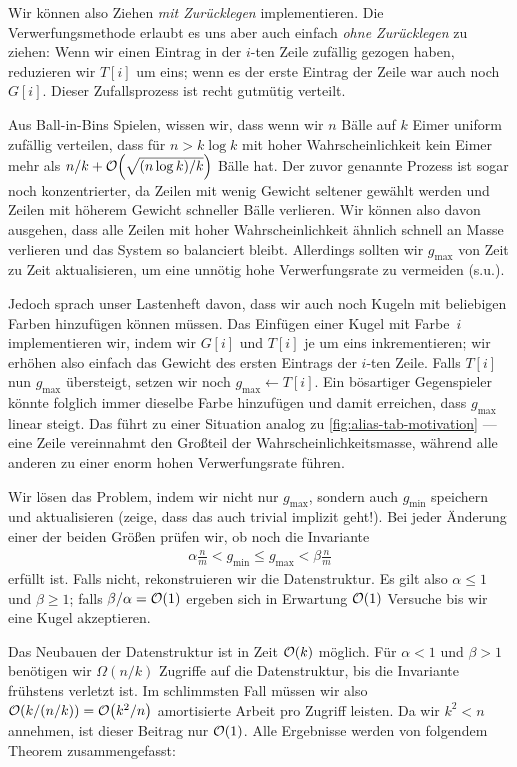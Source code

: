 Wir können also Ziehen \emph{mit Zurücklegen} implementieren.
Die Verwerfungsmethode erlaubt es uns aber auch einfach \emph{ohne Zurücklegen} zu ziehen:
Wenn wir einen Eintrag in der $i$-ten Zeile zufällig gezogen haben, reduzieren wir $T[i]$ um eins;
wenn es der erste Eintrag der Zeile war auch noch $G[i]$.
Dieser Zufallsprozess ist recht gutmütig verteilt.

Aus Ball-in-Bins Spielen, wissen wir, dass wenn wir $n$ Bälle auf $k$ Eimer uniform zufällig verteilen, dass für $n > k \log k$ mit hoher Wahrscheinlichkeit kein Eimer mehr als $n/k +\mathcal{O}\!\left(\sqrt{(n\log k) / k}\right)$ Bälle hat.
Der zuvor genannte Prozess ist sogar noch konzentrierter, da Zeilen mit wenig Gewicht seltener gewählt werden und Zeilen mit höherem Gewicht schneller Bälle verlieren.
Wir können also davon ausgehen, dass alle Zeilen mit hoher Wahrscheinlichkeit ähnlich schnell an Masse verlieren und das System so balanciert bleibt.
Allerdings sollten wir $g_\text{max}$ von Zeit zu Zeit aktualisieren, um eine unnötig hohe Verwerfungsrate zu vermeiden (s.u.).

Jedoch sprach unser Lastenheft davon, dass wir auch noch Kugeln mit beliebigen Farben hinzufügen können müssen.
Das Einfügen einer Kugel mit Farbe~$i$ implementieren wir, indem wir $G[i]$ und $T[i]$ je um eins inkrementieren;
wir erhöhen also einfach das Gewicht des ersten Eintrags der $i$-ten Zeile.
Falls $T[i]$ nun $g_\text{max}$ übersteigt, setzen wir noch $g_\text{max} \gets T[i]$.
Ein bösartiger Gegenspieler könnte folglich immer dieselbe Farbe hinzufügen und damit erreichen, dass $g_\text{max}$ linear steigt.
Das führt zu einer Situation analog zu \cref{fig:alias-tab-motivation}
--- eine Zeile vereinnahmt den Großteil der Wahrscheinlichkeitsmasse, während alle anderen zu einer enorm hohen Verwerfungsrate führen.

Wir lösen das Problem, indem wir nicht nur $g_\text{max}$, sondern auch $g_\text{min}$ speichern und aktualisieren (zeige, dass das auch trivial implizit geht!).
Bei jeder Änderung einer der beiden Größen prüfen wir, ob noch die Invariante
\begin{align}
    \alpha \frac n m < g_\text{min} \le g_\text{max} < \beta \frac n m
\end{align}
erfüllt ist.
Falls nicht, rekonstruieren wir die Datenstruktur.
Es gilt also $\alpha \le 1$ und $\beta \ge 1$; falls $\beta / \alpha = \mathcal{O}\!\left(1\right)$ ergeben sich in Erwartung $\mathcal{O}\!\left(1\right)$ Versuche bis wir eine Kugel akzeptieren.

Das Neubauen der Datenstruktur ist in Zeit $\mathcal{O}\!\left(k\right)$ möglich.
Für $\alpha < 1$ und $\beta > 1$ benötigen wir $\Omega(n / k)$ Zugriffe auf die Datenstruktur, bis die Invariante frühstens verletzt ist.
Im schlimmsten Fall müssen wir also $\mathcal{O}\!\left(k / (n / k)\right) = \mathcal{O}\!\left(k^2 / n\right)$ amortisierte Arbeit pro Zugriff leisten.
Da wir $k^2 < n$ annehmen, ist dieser Beitrag nur $\mathcal{O}\!\left(1\right)$.
Alle Ergebnisse werden von folgendem Theorem zusammengefasst:

